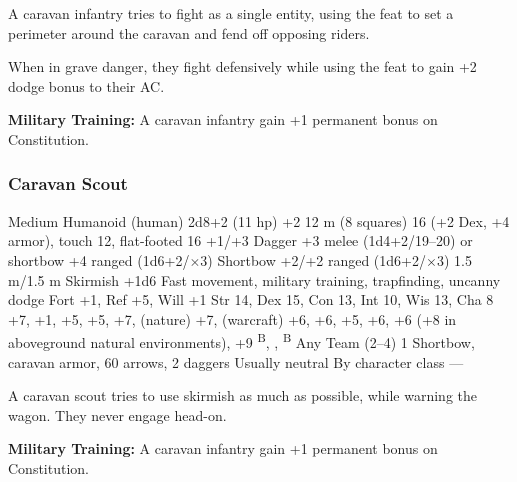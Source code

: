 A caravan infantry tries to fight as a single entity, using the  feat to set a perimeter around the caravan and fend off opposing riders.

When in grave danger, they fight defensively while using the  feat to gain +2 dodge bonus to their AC.

\textbf{Military Training:} A caravan infantry gain +1 permanent bonus on Constitution.

\subsubsection{Caravan Scout}
\begin{MonsterStats}
{Medium Humanoid (human)}
{2d8+2 (11 hp)}
{+2}
{12 m (8 squares)}
{16 (+2 Dex, +4 armor), touch 12, flat-footed 16}
{+1/+3}
{Dagger +3 melee (1d4+2/19--20) or shortbow +4 ranged (1d6+2/$\times$3)}
{Shortbow +2/+2 ranged (1d6+2/$\times$3)}
{1.5 m/1.5 m}
{Skirmish +1d6}
{Fast movement, military training, trapfinding, uncanny dodge}
{Fort +1, Ref +5, Will +1}
{Str 14, Dex 15, Con 13, Int 10, Wis 13, Cha 8}
{
     +7,
     +1,
     +5,
     +5,
     +7,
     (nature) +7,
     (warcraft) +6,
     +6,
     +5,
     +6,
     +6 (+8 in aboveground natural environments),
     +9
}
{
		\textsuperscript{B},
    ,
    \textsuperscript{B}
}
{Any}
{Team (2--4)}
{1}
{Shortbow, caravan armor, 60 arrows, 2 daggers}
{Usually neutral}
{By character class}
{---}
\end{MonsterStats}


A caravan scout tries to use skirmish as much as possible, while warning the wagon. They never engage head-on.

\textbf{Military Training:} A caravan infantry gain +1 permanent bonus on Constitution.


